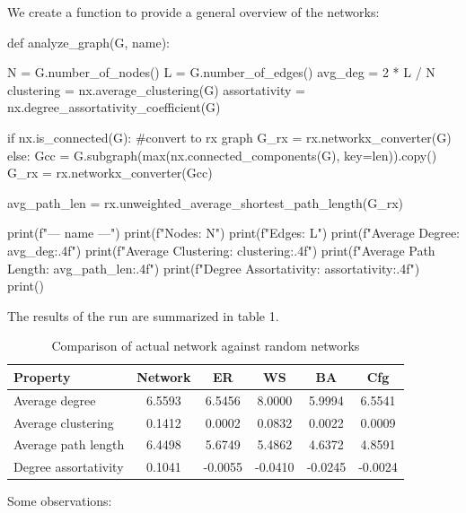 \documentclass[12pt]{article}
\begin{document}
We create a function to provide a general overview of the networks:
\begin{py}
	def analyze_graph(G, name):
	
	N = G.number_of_nodes()
	L = G.number_of_edges()
	avg_deg = 2 * L / N
	clustering = nx.average_clustering(G)
	assortativity = nx.degree_assortativity_coefficient(G)
	
	if nx.is_connected(G):
	#convert to rx graph
	G_rx = rx.networkx_converter(G)
	else:
	Gcc = G.subgraph(max(nx.connected_components(G), key=len)).copy()
	G_rx = rx.networkx_converter(Gcc)
	
	avg_path_len = rx.unweighted_average_shortest_path_length(G_rx)
	
	print(f"--- {name} ---")
	print(f"Nodes: {N}")
	print(f"Edges: {L}")
	print(f"Average Degree: {avg_deg:.4f}")
	print(f"Average Clustering: {clustering:.4f}")
	print(f"Average Path Length: {avg_path_len:.4f}")
	print(f"Degree Assortativity: {assortativity:.4f}")
	print()
\end{py}
The results of the run are summarized in table 1.
\begin{table}[h!]
	\centering
	\label{tab:network_comparison}
	\begin{tabular}{|l|c|c|c|c|c|}
		\hline
		\textbf{Property} & \textbf{Network} & \textbf{ER} & \textbf{WS} & \textbf{BA} & \textbf{Cfg} \\
		\hline
		Average degree & 6.5593 & 6.5456 & 8.0000 & 5.9994 & 6.5541 \\
		Average clustering & 0.1412 & 0.0002 & 0.0832 & 0.0022 & 0.0009 \\
		Average path length & 6.4498 & 5.6749 & 5.4862 & 4.6372 & 4.8591 \\
		Degree assortativity & 0.1041 & -0.0055 & -0.0410 & -0.0245 & -0.0024 \\
		\hline
	\end{tabular}
	\caption{Comparison of actual network against random networks}
\end{table}
Some observations:
\end{document}
